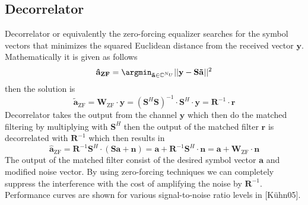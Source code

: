 \subsection{Decorrelator}
Decorrelator or equivalently the zero-forcing equalizer searches for the symbol vectors that minimizes the squared Euclidean distance from the received vector $\mathrm{\mathbf{y}}$. Mathematically it is given as follows
\begin{equation}
\mathrm{\mathbf{\hat{a}_{ZF}}}=\argmin_{\mathrm{\mathbf{\tilde{a}}}\in\mathbb{C}^{N_U}}\vert\vert\mathrm{\mathbf{y}}-\mathrm{\mathbf{S}}\mathrm{\mathbf{\tilde{a}}}\vert\vert^2
\end{equation}
then the solution is
\begin{equation}
\mathrm{\mathbf{\tilde{a}}_{ZF}}=\mathrm{\mathbf{W}_{ZF}} \cdot \mathrm{\mathbf{y}} = (\mathrm{\mathbf{S}}^H\mathrm{\mathbf{S}})^{-1} \cdot \mathrm{\mathbf{S}}^H\cdot\mathrm{\mathbf{y}}=\mathrm{\mathbf{R}}^{-1}\cdot\mathrm{\mathbf{r}}
\end{equation}
Decorrelator takes the output from the channel $\mathrm{\mathbf{y}}$ which then do the matched filtering by multiplying with $\mathrm{\mathbf{S}}^H$ then the output of the matched filter $\mathrm{\mathbf{r}}$ is decorrelated with $\mathrm{\mathbf{R}}^{-1}$ which then results in
\begin{equation}
\mathrm{\mathbf{\hat{a}}_{ZF}}=\mathrm{\mathbf{R}}^{-1}\mathrm{\mathbf{S}}^H\cdot(\mathrm{\mathbf{S}}\mathrm{\mathbf{a}}+\mathrm{\mathbf{n}})=\mathrm{\mathbf{a}}+\mathrm{\mathbf{R}}^{-1}\mathrm{\mathbf{S}}^H\cdot\mathrm{\mathbf{n}}=\mathrm{\mathbf{a}}+\mathrm{\mathbf{W}_{ZF}}\cdot\mathrm{\mathbf{n}}
\end{equation}
The output of the matched filter consist of the desired symbol vector $\mathrm{\mathbf{a}}$ and modified noise vector. By using zero-forcing techniques we can completely suppress the interference with the cost of amplifying the noise by $\mathrm{\mathbf{R}}^{-1}$. Performance curves are shown for various signal-to-noise ratio levels in [K\"uhn05].
